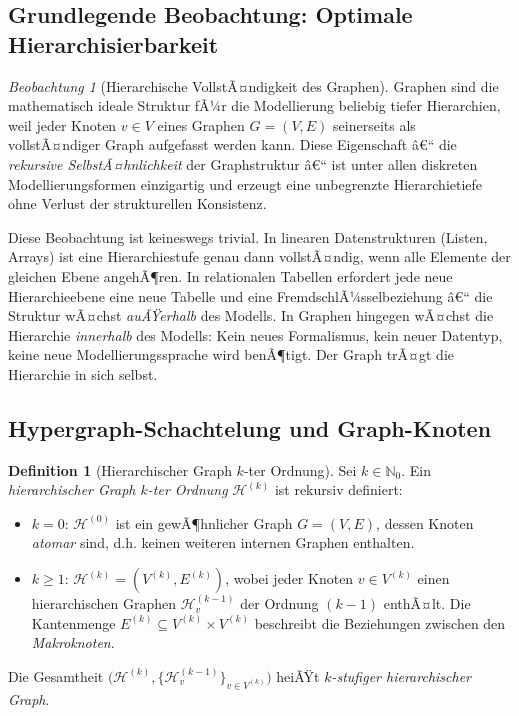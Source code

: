 ﻿\documentclass[12pt,a4paper,twoside]{article}
\theoremstyle{definition}
\newtheorem{definition}{Definition}[section]
\theoremstyle{plain}
\theoremstyle{remark}
\newtheorem{beobachtung}{Beobachtung}[section]
\begin{document}
\subsection{Grundlegende Beobachtung: Optimale Hierarchisierbarkeit}
\label{sub:beobachtung_hierarchie}

\begin{beobachtung}[Hierarchische VollstÃ¤ndigkeit des Graphen]
	\label{beob:hierarchie}
	Graphen sind die mathematisch ideale Struktur fÃ¼r die Modellierung
	beliebig tiefer Hierarchien, weil jeder Knoten $v \in V$ eines Graphen
	$G = (V, E)$ seinerseits als vollstÃ¤ndiger Graph aufgefasst werden kann.
	Diese Eigenschaft â€“ die \emph{rekursive SelbstÃ¤hnlichkeit} der
	Graphstruktur â€“ ist unter allen diskreten Modellierungsformen einzigartig
	und erzeugt eine unbegrenzte Hierarchietiefe ohne Verlust der
	strukturellen Konsistenz.
\end{beobachtung}

Diese Beobachtung ist keineswegs trivial.  In linearen Datenstrukturen
(Listen, Arrays) ist eine Hierarchiestufe genau dann vollstÃ¤ndig, wenn
alle Elemente der gleichen Ebene angehÃ¶ren.  In relationalen Tabellen
erfordert jede neue Hierarchieebene eine neue Tabelle und eine
FremdschlÃ¼sselbeziehung â€“ die Struktur wÃ¤chst \emph{auÃŸerhalb} des
Modells.  In Graphen hingegen wÃ¤chst die Hierarchie \emph{innerhalb}
des Modells: Kein neues Formalismus, kein neuer Datentyp, keine neue
Modellierungssprache wird benÃ¶tigt.  Der Graph trÃ¤gt die Hierarchie
in sich selbst.

\subsection{Hypergraph-Schachtelung und Graph-Knoten}
\label{sub:def_hierarchie}

\begin{definition}[Hierarchischer Graph $k$-ter Ordnung]
	\label{def:hgraph}
	Sei $k \in \mathbb{N}_0$.  Ein \emph{hierarchischer Graph $k$-ter
		Ordnung} $\mathcal{H}^{(k)}$ ist rekursiv definiert:
	\begin{itemize}
		\item $k = 0$: $\mathcal{H}^{(0)}$ ist ein gewÃ¶hnlicher Graph
		$G = (V, E)$, dessen Knoten \emph{atomar} sind, d.h. keinen
		weiteren internen Graphen enthalten.
		\item $k \geq 1$: $\mathcal{H}^{(k)} = (V^{(k)}, E^{(k)})$, wobei
		jeder Knoten $v \in V^{(k)}$ einen hierarchischen Graphen
		$\mathcal{H}^{(k-1)}_v$ der Ordnung $(k-1)$ enthÃ¤lt.  Die
		Kantenmenge $E^{(k)} \subseteq V^{(k)} \times V^{(k)}$ beschreibt
		die Beziehungen zwischen den \emph{Makroknoten}.
	\end{itemize}
	Die Gesamtheit $\bigl(\mathcal{H}^{(k)}, \{\mathcal{H}^{(k-1)}_v\}_{v \in V^{(k)}}\bigr)$
	heiÃŸt \emph{$k$-stufiger hierarchischer Graph}.
\end{definition}
\end{document}
